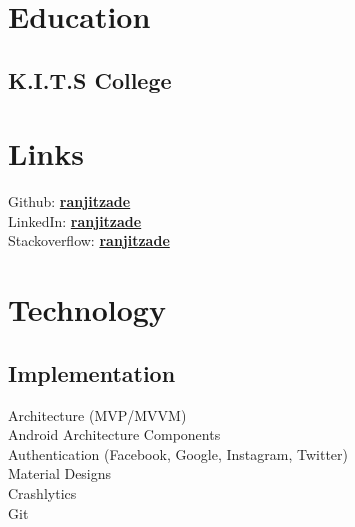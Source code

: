 \documentclass[]{deedy-resume-openfont}
\begin{document}
%
%

%
%

%
%

\begin{minipage}[t]{0.33\textwidth} 


\section{Education} 

\subsection{K.I.T.S College}
\sectionsep


\section{Links} 
Github: \href{https://github.com/ranjitzade}{\bf ranjitzade} \\
LinkedIn:  \href{https://www.linkedin.com/in/ranjitzade/}{\bf ranjitzade} \\
Stackoverflow:  \href{https://stackoverflow.com/users/3898498/ranjitzade}{\bf ranjitzade} \\


\section{Technology}
\subsection{Implementation}
Architecture (MVP/MVVM) \\
Android Architecture Components \\
Authentication (Facebook, Google, Instagram, Twitter) \\
Material Designs \\
Crashlytics \\
Git \\



\end{minipage}
\end{document}
